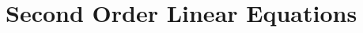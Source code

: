 \chapter{Second Order Linear Equations}
    \graphicspath{{../section_3.1/}}
    
    \graphicspath{{../section_3.2/}}
    
    \graphicspath{{../section_3.3/}}
    